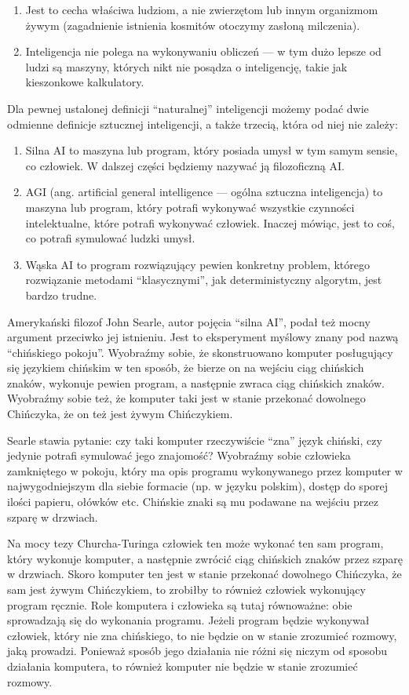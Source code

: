 \documentclass[10pt,a4paper]{article}
\begin{document}
	\begin{enumerate}
		\item Jest to cecha właściwa ludziom, a nie zwierzętom lub innym organizmom żywym (zagadnienie istnienia kosmitów otoczymy zasłoną milczenia).
		\item Inteligencja nie polega na wykonywaniu obliczeń — w tym dużo lepsze od ludzi są maszyny, których nikt nie posądza o inteligencję, takie jak kieszonkowe kalkulatory.
	\end{enumerate}
	\par Dla pewnej ustalonej definicji ``naturalnej'' inteligencji możemy podać dwie odmienne definicje sztucznej inteligencji, a także trzecią, która od niej nie zależy:
	\begin{enumerate}
		\item Silna AI to maszyna lub program, który posiada umysł w tym samym sensie, co człowiek. W dalszej części będziemy nazywać ją filozoficzną AI.
		\item AGI (ang. artificial general intelligence — ogólna sztuczna inteligencja) to maszyna lub program, który potrafi wykonywać wszystkie czynności intelektualne, które potrafi wykonywać człowiek. Inaczej mówiąc, jest to coś, co potrafi symulować ludzki umysł.
		\item Wąska AI to program rozwiązujący pewien konkretny problem, którego rozwiązanie metodami ``klasycznymi'', jak deterministyczny algorytm, jest bardzo trudne.
	\end{enumerate}
	\par Amerykański filozof John Searle, autor pojęcia ``silna AI'', podał też mocny argument przeciwko jej istnieniu. Jest to eksperyment myślowy znany pod nazwą ``chińskiego pokoju''. Wyobraźmy sobie, że skonstruowano komputer posługujący się językiem chińskim w ten sposób, że bierze on na wejściu ciąg chińskich znaków, wykonuje pewien program, a następnie zwraca ciąg chińskich znaków. Wyobraźmy sobie też, że komputer taki jest w stanie przekonać dowolnego Chińczyka, że on też jest żywym Chińczykiem.
	\par Searle stawia pytanie: czy taki komputer rzeczywiście ``zna'' język chiński, czy jedynie potrafi symulować jego znajomość? Wyobraźmy sobie człowieka zamkniętego w pokoju, który ma opis programu wykonywanego przez komputer w najwygodniejszym dla siebie formacie (np. w języku polskim), dostęp do sporej ilości papieru, ołówków etc. Chińskie znaki są mu podawane na wejściu przez szparę w drzwiach.
	\par Na mocy tezy Churcha-Turinga człowiek ten może wykonać ten sam program, który wykonuje komputer, a następnie zwrócić ciąg chińskich znaków przez szparę w drzwiach. Skoro komputer ten jest w stanie przekonać dowolnego Chińczyka, że sam jest żywym Chińczykiem, to zrobiłby to również człowiek wykonujący program ręcznie. Role komputera i człowieka są tutaj równoważne: obie sprowadzają się do wykonania programu. Jeżeli program będzie wykonywał człowiek, który nie zna chińskiego, to nie będzie on w stanie zrozumieć rozmowy, jaką prowadzi. Ponieważ sposób jego działania nie różni się niczym od sposobu działania komputera, to również komputer nie będzie w stanie zrozumieć rozmowy.
\end{document}
